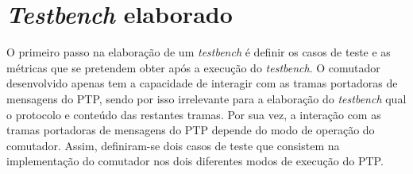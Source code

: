 \section{\textit{Testbench} elaborado}

O primeiro passo na elaboração de um \textit{testbench} é definir os casos de teste e as métricas que se pretendem obter após a execução do \textit{testbench}. O comutador desenvolvido apenas tem a capacidade de interagir com as tramas portadoras de mensagens do PTP, sendo por isso irrelevante para a elaboração do \textit{testbench} qual o protocolo e conteúdo das restantes tramas.  Por sua vez, a interação com as tramas portadoras de mensagens do PTP depende do modo de operação do comutador. Assim, definiram-se dois casos de teste que consistem na implementação do comutador nos dois diferentes modos de execução do PTP. \par

